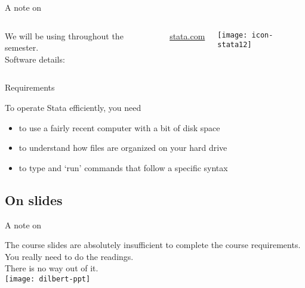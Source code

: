 \documentclass[t]{beamer}
\begin{document}
  \begin{frame}[t]{A note on }
  
    \begin{columns}[T]

      
      We will be using  throughout the semester.\\[1em]   

			Software details:
			
			\href{http://www.stata.com/}{stata.com}


			\begin{center}
				\vspace{-2em}
				\texttt{[image: icon-stata12]}
			\end{center}
			
    \end{columns}
  
      \vspace{1em}
      
      \begin{alertblock}{Requirements}

				To operate Stata efficiently, you need

        \begin{itemize}
					\item to use a fairly recent computer with a bit of disk space
        	\item to understand how files are organized on your hard drive
					\item to type and `run' commands that follow a specific syntax
        \end{itemize}
        
      \end{alertblock}
      
  \end{frame}

  \subsection{On slides}
  
  \begin{frame}[t]{A note on }

    The course slides are absolutely insufficient to complete the %
		course requirements. You really need to do the readings.\\[1em]
		
		There is no way out of it.\\[1em]
      
    \texttt{[image: dilbert-ppt]}

  \end{frame}
\end{document}
